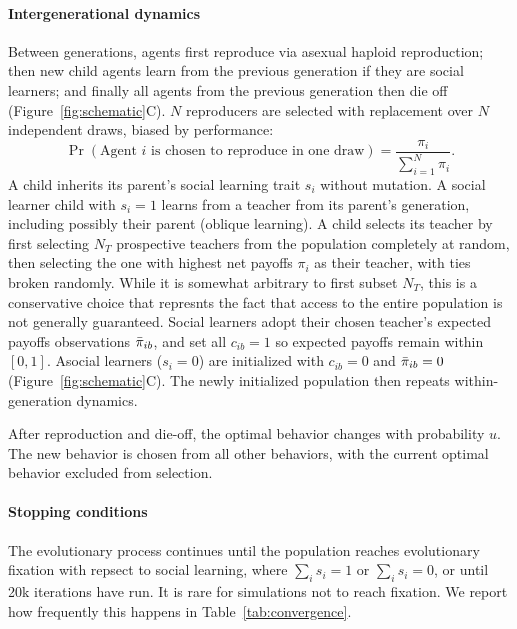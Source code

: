 \documentclass[letterpaper,11.5pt]{scrartcl}
\begin{document}
\paragraph{Intergenerational dynamics}
Between generations, agents first reproduce via asexual haploid reproduction; 
then new child agents learn from the
previous generation if they are social learners; and finally all agents from the
previous generation then die off (Figure~\ref{fig:schematic}C). 
$N$ reproducers are selected with replacement over $N$ independent draws, 
biased by performance:
\begin{equation}
  \Pr(\text{Agent $i$ is chosen to reproduce in one draw}) = \frac{\pi_i}{\sum_{i=1}^N \pi_i}.
\end{equation}
\noindent
A child inherits its parent's social learning trait $s_i$ without mutation.
A social learner child with $s_i = 1$ learns from a teacher from its parent's
generation, including possibly their parent (oblique learning). 
A child selects its teacher by first selecting $N_T$ prospective
teachers from the population completely at random, then selecting the one with
highest net payoffs $\pi_i$ as their teacher, with ties broken randomly. While it
is somewhat arbitrary to first subset $N_T$, this is a conservative choice that
represnts the fact that access to the entire population is not generally guaranteed.
Social learners adopt their chosen teacher's expected payoffs observations $\bar\pi_{ib}$,
and set all $c_{ib} = 1$ so expected payoffs remain within $[0, 1]$.  Asocial
learners ($s_i = 0$) are initialized with $c_{ib} = 0$ and $\bar\pi_{ib} = 0$ 
(Figure~\ref{fig:schematic}C). The
newly initialized population then repeats within-generation dynamics. 

After reproduction and die-off, the optimal behavior changes with probability
$u$. The new behavior is chosen from all other behaviors, with the 
current optimal behavior excluded from selection.

\paragraph{Stopping conditions} The evolutionary process continues until the
population reaches evolutionary fixation with repsect to social learning, where
$\sum_i s_i = 1$ or $\sum_i s_i = 0$, or until 20k iterations have run. 
It is rare for simulations not to reach fixation. We report how frequently
this happens in Table~\ref{tab:convergence}.

\clearpage
\end{document}
